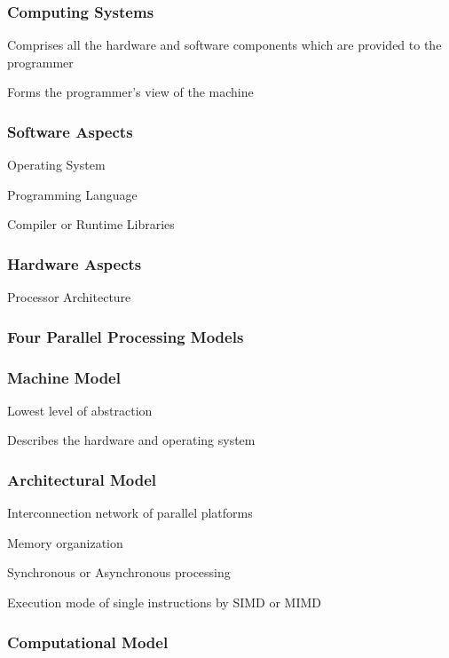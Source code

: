 \documentclass{article}
\begin{document}
\subsubsection{Computing Systems}

Comprises all the hardware and software components which are provided to the programmer

Forms the programmer's view of the machine

\subsubsection{Software Aspects}

Operating System

Programming Language

Compiler or Runtime Libraries

\subsubsection{Hardware Aspects}

Processor Architecture

\subsubsection{Four Parallel Processing Models}

\subsubsection{Machine Model}

Lowest level of abstraction

Describes the hardware and operating system

\subsubsection{Architectural Model}

Interconnection network of parallel platforms

Memory organization

Synchronous or Asynchronous processing

Execution mode of single instructions by SIMD or MIMD

\subsubsection{Computational Model}
\end{document}
